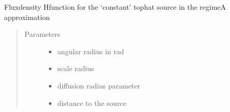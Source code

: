 \documentclass[letterpaper,10pt,english]{sphinxmanual}
\begin{document}
\begin{fulllineitems}
\label{\detokenize{diffsph.profiles:diffsph.profiles.analytics.cofdA}}
\sphinxAtStartPar
Flux\sphinxhyphen{}density H\sphinxhyphen{}function for the ‘constant’ top\sphinxhyphen{}hat source in the regime\sphinxhyphen{}A approximation
\begin{quote}\begin{description}
\item[{Parameters}] \leavevmode\begin{itemize}
\item {} 
\sphinxAtStartPar
{} \textendash{} angular radius in rad

\item {} 
\sphinxAtStartPar
{} \textendash{} scale radius

\item {} 
\sphinxAtStartPar
{} \textendash{} diffusion radius parameter

\item {} 
\sphinxAtStartPar
{} \textendash{} distance to the source

\end{itemize}

\end{description}\end{quote}

\end{fulllineitems}

\end{document}
